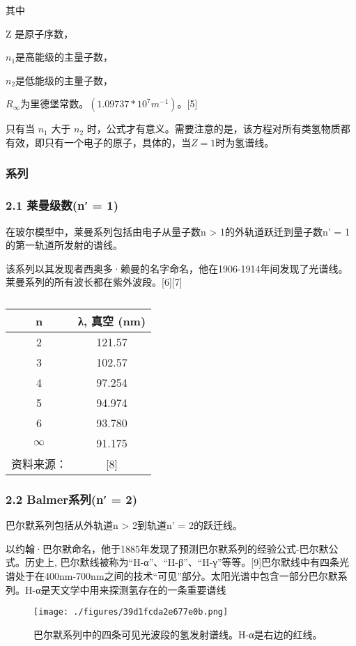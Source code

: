 其中

Z 是原子序数，

$n_1$是高能级的主量子数，

$n_2$是低能级的主量子数，

$R_{\infty}$为里德堡常数。$(1.09737*10^7 m^{-1})$。[5]

只有当 $n_1$  大于 $n_2$   时，公式才有意义。需要注意的是，该方程对所有类氢物质都有效，即只有一个电子的原子，具体的，当$Z=1$时为氢谱线。

\subsubsection{系列}

\subsubsection{2.1 莱曼级数(n′ = 1)}
在玻尔模型中，莱曼系列包括由电子从量子数n > 1的外轨道跃迁到量子数n' = 1的第一轨道所发射的谱线。

该系列以其发现者西奥多·赖曼的名字命名，他在1906-1914年间发现了光谱线。莱曼系列的所有波长都在紫外波段。[6][7]

\begin{table}[ht]
\centering
\caption{}\label{tab_QYZGP1}
\begin{tabular}{|c|c|}
\hline
n & λ, 真空
(nm) \\
\hline
2 & 121.57 \\
\hline
3 &102.57 \\
\hline
4 & 97.254 \\
\hline
5 & 94.974 \\
\hline
6 & 93.780 \\
\hline
$\infty$ &91.175 \\
\hline
资料来源： &[8]\\
\hline
\end{tabular}
\end{table}
\subsubsection{2.2 Balmer系列(n′ = 2)}
巴尔默系列包括从外轨道n > 2到轨道n' = 2的跃迁线。

以约翰·巴尔默命名，他于1885年发现了预测巴尔默系列的经验公式-巴尔默公式。历史上, 巴尔默线被称为“H-α”、“H-β”、“H-γ”等等。[9]巴尔默线中有四条光谱处于在400nm-700nm之间的技术“可见”部分。太阳光谱中包含一部分巴尔默系列。H-α是天文学中用来探测氢存在的一条重要谱线

\begin{figure}[ht]
\centering
\texttt{[image: ./figures/39d1fcda2e677e0b.png]}
\caption{巴尔默系列中的四条可见光波段的氢发射谱线。H-α是右边的红线。} \label{fig_QYZGP_1}
\end{figure}

